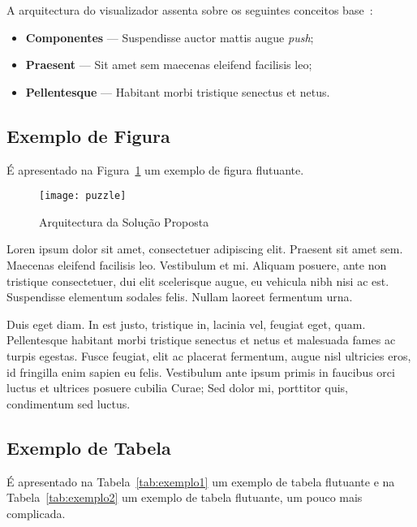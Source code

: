 A arquitectura do visualizador assenta sobre os seguintes conceitos
base~\cite{kn:ZPMD97}: 

\begin{itemize}
\item \textbf{Componentes} --- Suspendisse auctor mattis augue \emph{push};
\item \textbf{Praesent} --- Sit amet sem maecenas eleifend facilisis leo;
\item \textbf{Pellentesque} --- Habitant morbi tristique senectus et netus.
\end{itemize}

\subsection{Exemplo de Figura}

É apresentado na Figura~\ref{fig:arch} %
um exemplo de figura flutuante.

\begin{figure}[t]
  \begin{center}
    \leavevmode
    \texttt{[image: puzzle]}
    \caption{Arquitectura da Solução Proposta}
    \label{fig:arch}
  \end{center}
\end{figure}

Loren ipsum dolor sit amet, consectetuer adipiscing elit. 
Praesent sit amet sem. Maecenas eleifend facilisis leo. Vestibulum et
mi. Aliquam posuere, ante non tristique consectetuer, dui elit
scelerisque augue, eu vehicula nibh nisi ac est. Suspendisse elementum
sodales felis. Nullam laoreet fermentum urna. 

Duis eget diam. In est justo, tristique in, lacinia vel, feugiat eget,
quam. Pellentesque habitant morbi tristique senectus et netus et
malesuada fames ac turpis egestas. Fusce feugiat, elit ac placerat
fermentum, augue nisl ultricies eros, id fringilla enim sapien eu
felis. Vestibulum ante ipsum primis in faucibus orci luctus et
ultrices posuere cubilia Curae; Sed dolor mi, porttitor quis,
condimentum sed luctus. 

\subsection{Exemplo de Tabela}

É apresentado na Tabela~\ref{tab:exemplo1} um exemplo de tabela
flutuante e na Tabela~\ref{tab:exemplo2} um exemplo de tabela
flutuante, um pouco mais complicada.

